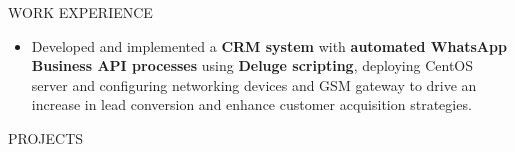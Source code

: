 \documentclass{resume} %
\begin{document}
\begin{rSection}{WORK EXPERIENCE}
\begin{itemize}
              \item Developed and implemented a \textbf{CRM system} with \textbf{automated WhatsApp Business API processes} using \textbf{Deluge scripting}, deploying CentOS server and configuring networking devices and GSM gateway to drive an increase in lead conversion and enhance customer acquisition strategies.
    \end{itemize}
\end{rSection}


\begin{rSection}{PROJECTS}
    \vspace{-1.25em}



\end{rSection}
\end{document}

